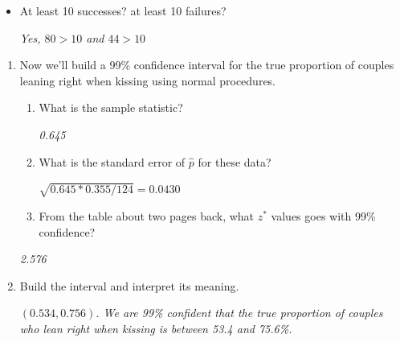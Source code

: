 \begin{enumerate}
\begin{itemize}
\begin{key}
  {\it  Couple should act independently, so this assumption is met.}
\end{key}
        \item At least 10 successes? at least 10 failures?   
\begin{students}
        \vspace{1cm}        
\end{students}

\begin{key}
  {\it  Yes, $80>10$ and $44 > 10$}
\end{key}
     \end{itemize}
     \begin{enumerate}
     \item Now we'll build a 99\% confidence interval for the true
       proportion of couples leaning right when kissing using normal
       procedures. 
       \begin{enumerate}
       \item What is the sample statistic?  
\begin{students}
        \vspace{1cm}        
\end{students}

\begin{key}
  {\it  0.645}
\end{key}
       \item What is the standard error of $\widehat{p}$ for these
         data?   
\begin{students}
        \vspace{.7cm}        
\end{students}

\begin{key}
  {\it  $\sqrt{0.645 * 0.355 / 124} = 0.0430 $}
\end{key}
       \item From the table about two pages back, what $z^*$ values
         goes with 99\% confidence?   
       \end{enumerate}
\begin{students}
        \vspace{.7cm}        
\end{students}

\begin{key}
  {\it  2.576}
\end{key}
       \item Build the interval and interpret its meaning. 
\begin{students}
        \vspace{2in}
\end{students}

\begin{key}
 {\it $(0.534, 0.756)$.  We are 99\% confident that the true
    proportion of couples who lean right when kissing is between 53.4
    and 75.6\%. }
\end{key}
     \end{enumerate}
   \end{enumerate}

